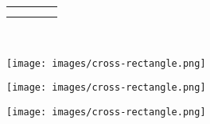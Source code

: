 \documentclass[10pt,]{article}
\theoremstyle{plain}
\theoremstyle{definition}
\theoremstyle{definition}
\theoremstyle{definition}
\theoremstyle{definition}
\theoremstyle{definition}
\theoremstyle{definition}
\numberwithin{equation}{section}
\newlength{\panelmax}
\begin{document}
\begin{figure}
{\begin{tabular}{@{}*{4}{c}@{}}
\begin{minipage}[c][\panelmax][t]{0.2\linewidth}\usebox{\panelboxBimage}\end{minipage}&
\begin{minipage}[c][\panelmax][t]{0.2\linewidth}\usebox{\panelboxCimage}\end{minipage}&
\begin{minipage}[c][\panelmax][t]{0.2\linewidth}\usebox{\panelboxDimage}\end{minipage}\tabularnewline
\parbox[t]{0.2\linewidth}{\subcaption{\label{figure-89}}
}&
\parbox[t]{0.2\linewidth}{\subcaption{\label{figure-90}}
}&
\parbox[t]{0.2\linewidth}{\subcaption{\label{figure-91}}
}&
\parbox[t]{0.2\linewidth}{\subcaption{\label{figure-92}}
}\end{tabular}\\
}%
{%
\setlength{\panelmax}{0pt}
\ifdefined\panelboxAimage\else\newsavebox{\panelboxAimage}\fi%
\begin{lrbox}{\panelboxAimage}
\texttt{[image: images/cross-rectangle.png]}
\end{lrbox}
\ifdefined\phAimage\else\newlength{\phAimage}\fi%
\setlength{\phAimage}{\ht\panelboxAimage+\dp\panelboxAimage}
\settototalheight{\phAimage}{\usebox{\panelboxAimage}}
\setlength{\panelmax}{\maxof{\panelmax}{\phAimage}}
\ifdefined\panelboxBimage\else\newsavebox{\panelboxBimage}\fi%
\begin{lrbox}{\panelboxBimage}
\texttt{[image: images/cross-rectangle.png]}
\end{lrbox}
\ifdefined\phBimage\else\newlength{\phBimage}\fi%
\setlength{\phBimage}{\ht\panelboxBimage+\dp\panelboxBimage}
\settototalheight{\phBimage}{\usebox{\panelboxBimage}}
\setlength{\panelmax}{\maxof{\panelmax}{\phBimage}}
\ifdefined\panelboxCimage\else\newsavebox{\panelboxCimage}\fi%
\begin{lrbox}{\panelboxCimage}
\texttt{[image: images/cross-rectangle.png]}
\end{lrbox}
\ifdefined\phCimage\else\newlength{\phCimage}\fi%
\setlength{\phCimage}{\ht\panelboxCimage+\dp\panelboxCimage}
\settototalheight{\phCimage}{\usebox{\panelboxCimage}}
\setlength{\panelmax}{\maxof{\panelmax}{\phCimage}}
\ifdefined\panelboxDimage\else\newsavebox{\panelboxDimage}\fi%
\begin{lrbox}{\panelboxDimage}

\end{lrbox}}
\end{figure}
\end{document}
